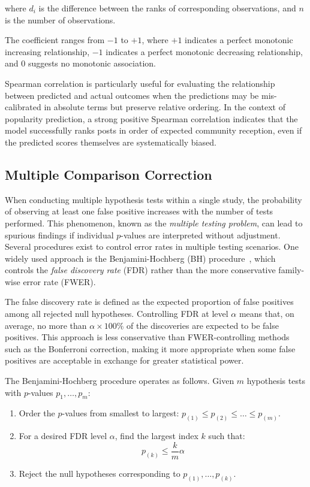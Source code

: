 where $d_i$ is the difference between the ranks of corresponding observations, and $n$ is the number of observations.

The coefficient ranges from $-1$ to $+1$, where $+1$ indicates a perfect monotonic increasing relationship, $-1$ indicates a perfect monotonic decreasing relationship, and $0$ suggests no monotonic association. 

Spearman correlation is particularly useful for evaluating the relationship between predicted and actual outcomes when the predictions may be mis-calibrated in absolute terms but preserve relative ordering. In the context of popularity prediction, a strong positive Spearman correlation indicates that the model successfully ranks posts in order of expected community reception, even if the predicted scores themselves are systematically biased.

\subsection{Multiple Comparison Correction}
\label{subsec:multiple_testing}

When conducting multiple hypothesis tests within a single study, the probability of observing at least one false positive increases with the number of tests performed. 
This phenomenon, known as the \emph{multiple testing problem}, can lead to spurious findings if individual $p$-values are interpreted without adjustment.
Several procedures exist to control error rates in multiple testing scenarios. 
One widely used approach is the Benjamini-Hochberg (BH) procedure~\cite{benjamini1995controlling}, which controls the \emph{false discovery rate} (FDR) rather than the more conservative family-wise error rate (FWER).

The false discovery rate is defined as the expected proportion of false positives among all rejected null hypotheses. 
Controlling FDR at level $\alpha$ means that, on average, no more than $\alpha \times 100\%$ of the discoveries are expected to be false positives. 
This approach is less conservative than FWER-controlling methods such as the Bonferroni correction\cite{bonferroni1936teoria}, making it more appropriate when some false positives are acceptable in exchange for greater statistical power.

The Benjamini-Hochberg procedure operates as follows. Given $m$ hypothesis tests with $p$-values $p_1, \ldots, p_m$:

\begin{enumerate}
    \item Order the $p$-values from smallest to largest: $p_{(1)} \leq p_{(2)} \leq \ldots \leq p_{(m)}$.
    \item For a desired FDR level $\alpha$, find the largest index $k$ such that:
    \begin{equation}
    p_{(k)} \leq \frac{k}{m} \alpha
    \end{equation}
    \item Reject the null hypotheses corresponding to $p_{(1)}, \ldots, p_{(k)}$.
\end{enumerate}

